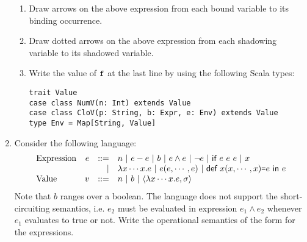 \begin{enumerate}
\begin{enumerate}
\item Draw arrows on the above expression from each bound variable to its binding occurrence.
\item Draw dotted arrows on the above expression from each shadowing variable to its shadowed variable.
\item Write the value of $\texttt{f}$ at the last line by using the following Scala types:
\begin{verbatim}
trait Value
case class NumV(n: Int) extends Value
case class CloV(p: String, b: Expr, e: Env) extends Value
type Env = Map[String, Value]
\end{verbatim}
\end{enumerate}

\item Consider the following language:
\[
\begin{array}{lrrl}
  \text{Expression} & e & ::= & n\ |\ \esub{e}{e}\ |\ b\ |\ e\wedge e\ |\ \neg
  e\ |\ \textsf{if}\ e\ e\ e\ |\ x \\
  &&|& \efun{x\cdots x}{e}\ |\ \eappfo{e}{e,\cdots,e}\ |\
  \erec{x}{x,\cdots,x}{e}{e} \\
  \text{Value} & v & ::= & n\ |\ b\ |\ \clov{x\cdots x}{e}{\sigma} \\
\end{array}
\]
Note that $b$ ranges over a boolean. The language does not support the short-circuiting
semantics, i.e. $e_2$ must be evaluated in expression $e_1\wedge e_2$ whenever $e_1$
evaluates to true or not.
Write the operational semantics of the form  for the expressions.
\end{enumerate}
